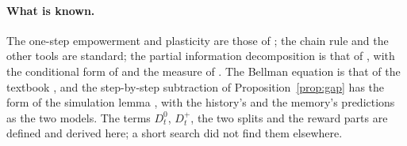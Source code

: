 \documentclass{article}
\theoremstyle{definition}
\theoremstyle{remark}
\begin{document}
\paragraph{What is known.} The one-step empowerment and plasticity are those of \citet{abel2025plasticity}; the chain rule and the other tools are standard; the partial information decomposition is that of \citet{williams2010nonnegative}, with the conditional form of \citet{matthias2025novel} and the measure of \citet{bertschinger2014quantifying}. The Bellman equation is that of the textbook \citep{sutton2018reinforcement}, and the step-by-step subtraction of Proposition~\ref{prop:gap} has the form of the simulation lemma \citep{kearns2002near}, with the history's and the memory's predictions as the two models. The terms $D^0_t$, $D^+_t$, the two splits and the reward parts are defined and derived here; a short search did not find them elsewhere.



\end{document}

